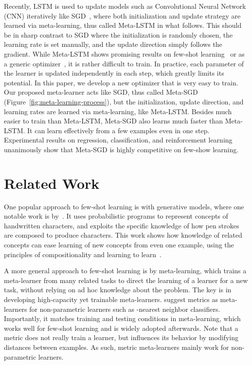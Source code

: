 \documentclass{article}
\begin{document}
Recently, LSTM is used to update models such as Convolutional Neural Network (CNN) iteratively like SGD~\cite{andrychowicz2016learning,ravi2017optimization}, where both initialization and update strategy are learned via meta-learning, thus called Meta-LSTM in what follows. This should be in sharp contrast to SGD where the initialization is randomly chosen, the learning rate is set manually, and the update direction simply follows the gradient. While Meta-LSTM shows promising results on few-shot learning~\cite{ravi2017optimization} or as a generic optimizer~\cite{andrychowicz2016learning}, it is rather difficult to train. In practice, each parameter of the learner is updated independently in each step, which greatly limits its potential. In this paper, we develop a new optimizer that is very easy to train. Our proposed  meta-learner acts like SGD, thus called Meta-SGD (Figure~\ref{fig:meta-learning-process}), but the initialization, update direction, and learning rates are learned via meta-learning, like Meta-LSTM. Besides much easier to train than Meta-LSTM, Meta-SGD also learns much faster than Meta-LSTM. It can learn effectively from a few examples even in one step. Experimental results on regression, classification, and reinforcement learning unanimously show that Meta-SGD is highly competitive on few-show learning.



















 \section{Related Work}




One popular approach to few-shot learning is with generative models, where one notable work is by~\cite{lake2015human}. It uses probabilistic programs to represent concepts of handwritten characters, and exploits the specific knowledge of how pen strokes are composed to produce characters. This work shows how knowledge of related concepts can ease learning of new concepts from even one example, using the principles of compositionality and learning to learn~\cite{lake2016building}.

A more general approach to few-shot learning is by meta-learning, which trains a meta-learner from many related tasks to direct the learning of a learner for a new task,
without relying on ad hoc knowledge about the problem.
The key is in developing high-capacity yet trainable meta-learners.
\cite{vinyals2016matching} suggest metrics as meta-learners for non-parametric learners such as -nearest neighbor classifiers. Importantly, it matches training and testing conditions in meta-learning, which works well for few-shot learning and is widely adopted afterwards. Note that a metric does not really train a learner, but influences its behavior by modifying distances between examples. As such, metric meta-learners mainly work for non-parametric learners.
\end{document}
